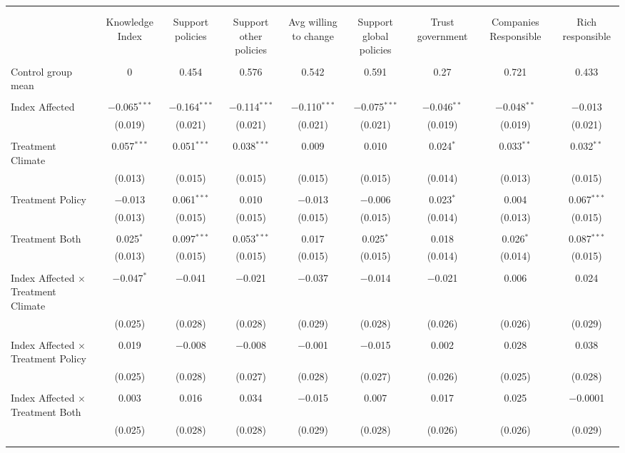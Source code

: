 
\begin{tabular}{@{\extracolsep{5pt}}lcccccccc} 
\\[-1.8ex]\hline 
\hline \\[-1.8ex] 
\\[-1.8ex] & Knowledge Index & Support policies & Support other policies & Avg willing to change & Support global policies & Trust government & Companies Responsible & Rich responsible \\ 
\hline \\[-1.8ex] 
 Control group mean & 0 & 0.454 & 0.576 & 0.542 & 0.591 & 0.27 & 0.721 & 0.433  \\ \hline \\[-1.8ex] Index Affected & $-$0.065$^{***}$ & $-$0.164$^{***}$ & $-$0.114$^{***}$ & $-$0.110$^{***}$ & $-$0.075$^{***}$ & $-$0.046$^{**}$ & $-$0.048$^{**}$ & $-$0.013 \\ 
  & (0.019) & (0.021) & (0.021) & (0.021) & (0.021) & (0.019) & (0.019) & (0.021) \\ 
  & & & & & & & & \\ 
 Treatment Climate & 0.057$^{***}$ & 0.051$^{***}$ & 0.038$^{***}$ & 0.009 & 0.010 & 0.024$^{*}$ & 0.033$^{**}$ & 0.032$^{**}$ \\ 
  & (0.013) & (0.015) & (0.015) & (0.015) & (0.015) & (0.014) & (0.013) & (0.015) \\ 
  & & & & & & & & \\ 
 Treatment Policy & $-$0.013 & 0.061$^{***}$ & 0.010 & $-$0.013 & $-$0.006 & 0.023$^{*}$ & 0.004 & 0.067$^{***}$ \\ 
  & (0.013) & (0.015) & (0.015) & (0.015) & (0.015) & (0.014) & (0.013) & (0.015) \\ 
  & & & & & & & & \\ 
 Treatment Both & 0.025$^{*}$ & 0.097$^{***}$ & 0.053$^{***}$ & 0.017 & 0.025$^{*}$ & 0.018 & 0.026$^{*}$ & 0.087$^{***}$ \\ 
  & (0.013) & (0.015) & (0.015) & (0.015) & (0.015) & (0.014) & (0.014) & (0.015) \\ 
  & & & & & & & & \\ 
 Index Affected $\times$ Treatment Climate & $-$0.047$^{*}$ & $-$0.041 & $-$0.021 & $-$0.037 & $-$0.014 & $-$0.021 & 0.006 & 0.024 \\ 
  & (0.025) & (0.028) & (0.028) & (0.029) & (0.028) & (0.026) & (0.026) & (0.029) \\ 
  & & & & & & & & \\ 
 Index Affected $\times$ Treatment Policy & 0.019 & $-$0.008 & $-$0.008 & $-$0.001 & $-$0.015 & 0.002 & 0.028 & 0.038 \\ 
  & (0.025) & (0.028) & (0.027) & (0.028) & (0.027) & (0.026) & (0.025) & (0.028) \\ 
  & & & & & & & & \\ 
 Index Affected $\times$ Treatment Both & 0.003 & 0.016 & 0.034 & $-$0.015 & 0.007 & 0.017 & 0.025 & $-$0.0001 \\ 
  & (0.025) & (0.028) & (0.028) & (0.029) & (0.028) & (0.026) & (0.026) & (0.029) \\ 
  & & & & & & & & \\ 
\hline \\[-1.8ex] 


\end{tabular}
